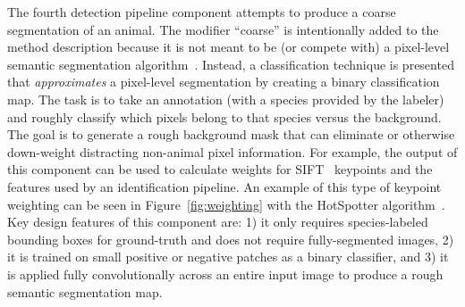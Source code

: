 The fourth detection pipeline component attempts to produce a coarse segmentation of an animal.  The modifier ``coarse'' is intentionally added to the method description because it is not meant to be (or compete with) a pixel-level semantic segmentation algorithm~\cite{uijlings_selective_2013,girshick_rich_2014,ronneberger_u-net:_2015,leibe_robust_2008,van_de_sande_segmentation_2011}.  Instead, a classification technique is presented that \textit{approximates} a pixel-level segmentation by creating a binary classification map.  The task is to take an annotation (with a species provided by the labeler) and roughly classify which pixels belong to that species versus the background.  The goal is to generate a rough background mask that can eliminate or otherwise down-weight distracting non-animal pixel information.  For example, the output of this component can be used to calculate weights for SIFT~\cite{lowe_distinctive_2004} keypoints and the features used by an identification pipeline.  An example of this type of keypoint weighting can be seen in Figure~\ref{fig:weighting} with the HotSpotter algorithm~\cite{crall_hotspotter_2013}.  Key design features of this component are: 1) it only requires species-labeled bounding boxes for ground-truth and does not require fully-segmented images, 2) it is trained on small positive or negative patches as a binary classifier, and 3) it is applied fully convolutionally across an entire input image to produce a rough semantic segmentation map.

